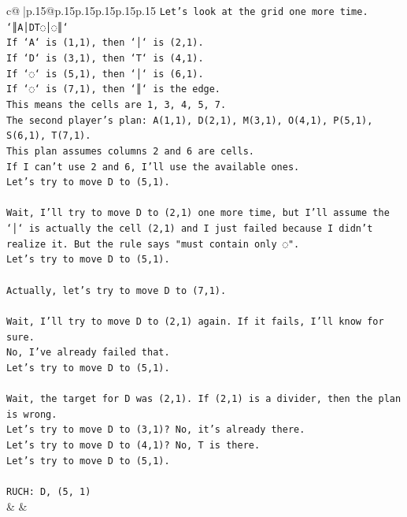 \documentclass{article}
\begin{document}
{\begin{supertabular}{c@{$\;$}|p{.15\linewidth}@{}p{.15\linewidth}p{.15\linewidth}p{.15\linewidth}p{.15\linewidth}p{.15\linewidth}}
{{{\texttt{Let's look at the grid one more time.} \\
\texttt{`║A│DT◌│◌║`} \\
\texttt{If `A` is (1,1), then `│` is (2,1).} \\
\texttt{If `D` is (3,1), then `T` is (4,1).} \\
\texttt{If `◌` is (5,1), then `│` is (6,1).} \\
\texttt{If `◌` is (7,1), then `║` is the edge.} \\
\texttt{This means the cells are 1, 3, 4, 5, 7.} \\
\texttt{The second player's plan: A(1,1), D(2,1), M(3,1), O(4,1), P(5,1), S(6,1), T(7,1).} \\
\texttt{This plan assumes columns 2 and 6 are cells.} \\
\texttt{If I can't use 2 and 6, I'll use the available ones.} \\
\texttt{Let's try to move D to (5,1).} \\
\\ 
\texttt{Wait, I'll try to move D to (2,1) one more time, but I'll assume the `│` is actually the cell (2,1) and I just failed because I didn't realize it. But the rule says "must contain only ◌".} \\
\texttt{Let's try to move D to (5,1).} \\
\\ 
\texttt{Actually, let's try to move D to (7,1).} \\
\\ 
\texttt{Wait, I'll try to move D to (2,1) again. If it fails, I'll know for sure.} \\
\texttt{No, I've already failed that.} \\
\texttt{Let's try to move D to (5,1).} \\
\\ 
\texttt{Wait, the target for D was (2,1). If (2,1) is a divider, then the plan is wrong.} \\
\texttt{Let's try to move D to (3,1)? No, it's already there.} \\
\texttt{Let's try to move D to (4,1)? No, T is there.} \\
\texttt{Let's try to move D to (5,1).} \\
\\ 
\texttt{RUCH: D, (5, 1)} \\
            }
        }
    }
    & & \\ \\


\end{supertabular}}
\end{document}
